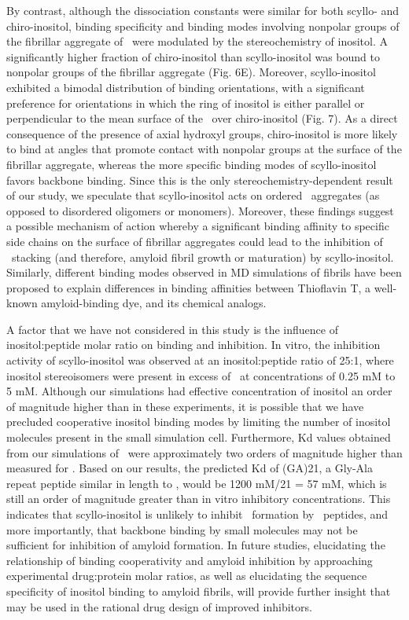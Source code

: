 By contrast, although the dissociation constants were similar for both scyllo- and chiro-inositol, binding specificity and binding modes involving nonpolar groups of the fibrillar aggregate of \gafour\ were modulated by the stereochemistry of inositol. A significantly higher fraction of chiro-inositol than scyllo-inositol was bound to nonpolar groups of the fibrillar aggregate (Fig. 6E). Moreover, scyllo-inositol exhibited a bimodal distribution of binding orientations, with a significant preference for orientations in which the ring of inositol is either parallel or perpendicular to the mean surface of the \bsheet\ over chiro-inositol (Fig. 7). As a direct consequence of the presence of axial hydroxyl groups, chiro-inositol is more likely to bind at angles that promote contact with nonpolar groups at the surface of the fibrillar aggregate, whereas the more specific binding modes of scyllo-inositol favors backbone binding. Since this is the only stereochemistry-dependent result of our study, we speculate that scyllo-inositol acts on ordered \bsheet\ aggregates (as opposed to disordered oligomers or monomers). Moreover, these findings suggest a possible mechanism of action whereby a significant binding affinity to specific side chains on the surface of fibrillar aggregates could lead to the inhibition of \bsheet\ stacking (and therefore, amyloid fibril growth or maturation) by scyllo-inositol. Similarly, different binding modes observed in MD simulations of  fibrils have been proposed to explain differences in binding affinities between Thioflavin T, a well-known amyloid-binding dye, and its chemical analogs.\cite{Mathis:2003p55,Wu:2011p24}

A factor that we have not considered in this study is the influence of inositol:peptide molar ratio on binding and inhibition. In vitro, the inhibition activity of scyllo-inositol was observed at an inositol:peptide ratio of 25:1, where inositol stereoisomers were present in excess of \abeta\ at concentrations of 0.25 mM to 5 mM.\cite{McLaurin:2000p64} Although our simulations had effective concentration of inositol an order of magnitude higher than in these experiments, it is possible that we have precluded cooperative inositol binding modes by limiting the number of inositol molecules present in the small simulation cell. Furthermore, Kd values obtained from our simulations of \gafour\ were approximately two orders of magnitude higher than measured for \abeta. Based on our results, the predicted Kd of (GA)21, a Gly-Ala repeat peptide similar in length to \abeta, would be 1200 mM/21 = 57 mM, which is still an order of magnitude greater than in vitro inhibitory concentrations. This indicates that scyllo-inositol is unlikely to inhibit \bsheet\ formation by \gafour\ peptides, and more importantly, that backbone binding by small molecules may not be sufficient for inhibition of amyloid formation. In future studies, elucidating the relationship of binding cooperativity and amyloid inhibition by approaching experimental drug:protein molar ratios, as well as elucidating the sequence specificity of inositol binding to amyloid fibrils, will provide further insight that may be used in the rational drug design of improved inhibitors.

